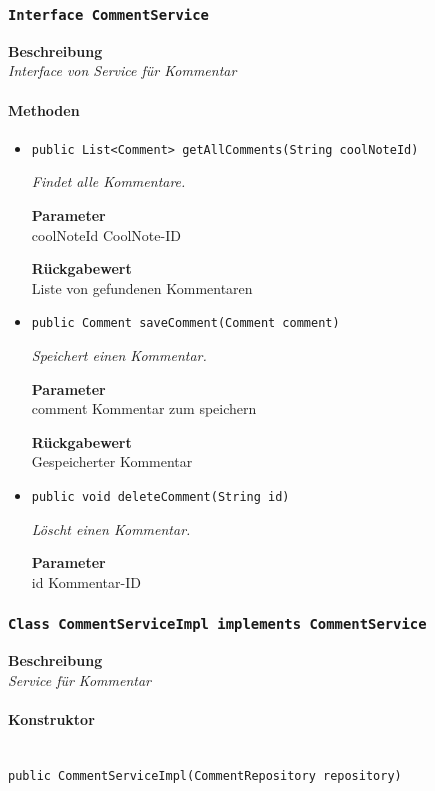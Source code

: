      \subsubsection{\texttt{Interface CommentService}}
     \textbf{Beschreibung} \\
     \textit{Interface von Service für Kommentar}
     \paragraph*{Methoden}
     \begin{itemize}
     	\item{\texttt{public List<Comment> getAllComments(String coolNoteId)}}
     	
     	\textit{Findet alle Kommentare.}
     	
     	\textbf{Parameter} \\
     	coolNoteId CoolNote-ID
     	
     	\textbf{Rückgabewert} \\
     	Liste von gefundenen Kommentaren        \item{\texttt{public Comment saveComment(Comment comment)}}
     	
     	\textit{Speichert einen Kommentar.}
     	
     	\textbf{Parameter} \\
     	comment Kommentar zum speichern
     	
     	\textbf{Rückgabewert} \\
     	Gespeicherter Kommentar        \item{\texttt{public void deleteComment(String id)}}
     	
     	\textit{Löscht einen Kommentar.}
     	
     	\textbf{Parameter} \\
     	id Kommentar-ID
     	
     	
     \end{itemize}
     \subsubsection{\texttt{Class CommentServiceImpl implements CommentService}}
     \textbf{Beschreibung} \\
     \textit{Service für Kommentar}
     \paragraph*{Konstruktor}\mbox{} \\
     \texttt{public CommentServiceImpl(CommentRepository repository)} \\
